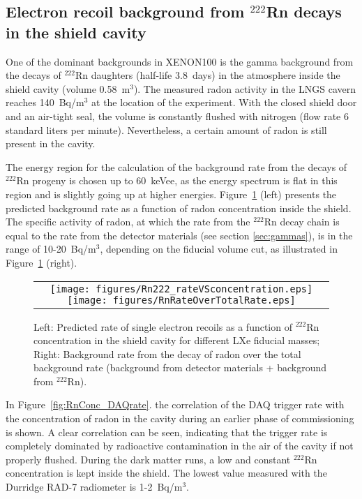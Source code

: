 \subsection{Electron recoil background from $^{222}$Rn decays in the shield cavity}
\label{sec:radon}

One of the dominant backgrounds in XENON100 is the gamma background from the
decays of ${^{222}}$Rn daughters (half-life 3.8~days) in the
atmosphere inside the shield cavity (volume 0.58~m$^3$). The measured radon activity 
in the LNGS cavern reaches 140~Bq/m$^3$ at the location of the experiment. With the closed
shield door and an air-tight seal, the volume is
constantly flushed with nitrogen (flow rate 6 standard liters per minute). Nevertheless, a certain
amount of radon is still present in the cavity. 

The energy region for the calculation of the background rate from the decays of ${^{222}}$Rn progeny is chosen up to 60~keVee, as the 
energy spectrum is flat in this region and is slightly going up at higher energies.
Figure~\ref{fig:radon} (left) presents the predicted background rate as a function of radon concentration inside the shield.
The specific activity of radon, at which the rate from the ${^{222}}$Rn decay
chain is equal to the rate from the detector materials (see section \ref{sec:gammas}), 
is in the range of 10-20~Bq/m$^3$, depending on the fiducial volume cut, as illustrated in Figure~\ref{fig:radon} (right).

\begin{figure}[!h]
\begin{center}
\begin{tabular}{c}
\texttt{[image: figures/Rn222\_rateVSconcentration.eps]}
\texttt{[image: figures/RnRateOverTotalRate.eps]}
\end{tabular}
\caption{Left: Predicted rate of single electron recoils as a function of ${^{222}}$Rn concentration in the
  shield cavity for different LXe fiducial masses; Right: Background rate from the decay of radon over the total 
  background rate (background from detector materials + background from $^{222}$Rn).}
\label{fig:radon}
\end{center}
\end{figure}

In Figure~\ref{fig:RnConc_DAQrate}.
the correlation of the DAQ trigger rate with the concentration of radon in the
cavity during an earlier phase of commissioning is shown. A clear correlation can be seen, indicating that the trigger rate is completely dominated by radioactive contamination in the air of the cavity if not properly flushed. During the dark matter runs, a low and constant $^{222}$Rn
concentration is kept inside the shield. The lowest value measured with the Durridge RAD-7 radiometer is 1-2~Bq/m$^3$.


